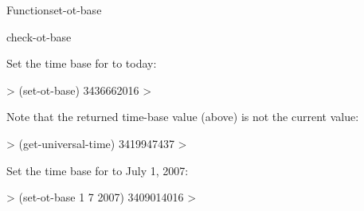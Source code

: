 \documentclass[10pt,twoside,english,pdftex]{article}
\begin{document}
\begin{functiondoc}{Function}{set-ot-base}{ 
    }
\begin{alsos}{check-ot-base}
\also[*ot-base*]
\also[ot2ut]
\also[ut2ot]
\end{alsos}

\fnexamples
Set the time base for  to today:
%
\W\supp
\begin{example}
  > (set-ot-base)
  3436662016
  >
\end{example}
Note that the returned  time-base value (above) is not the current  value:
%
\W\supp\notpretop
\begin{example}
  > (get-universal-time)
  3419947437
  >
\end{example}

Set the time base for  to July 1, 2007:
%
\W\supp
\begin{example}
  > (set-ot-base 1 7 2007)
  3409014016
  >
\end{example}

\end{functiondoc}

\end{document}
